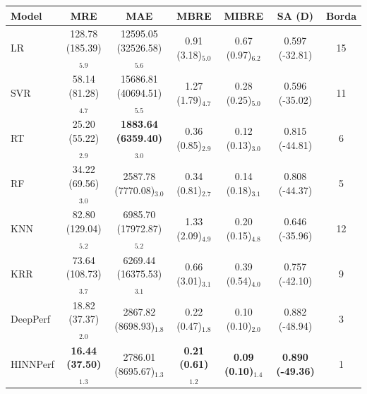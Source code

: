\begin{tabular}{lcccccc}
\toprule
Model & MRE & MAE & MBRE & MIBRE & SA (D) & Borda \\
\midrule
LR & 128.78 (185.39)$_{5.9}$ & 12595.05 (32526.58)$_{5.6}$ & 0.91 (3.18)$_{5.0}$ & 0.67 (0.97)$_{6.2}$ & 0.597 (-32.81) & 15 \\
SVR & 58.14 (81.28)$_{4.7}$ & 15686.81 (40694.51)$_{5.5}$ & 1.27 (1.79)$_{4.7}$ & 0.28 (0.25)$_{5.0}$ & 0.596 (-35.02) & 11 \\
RT & 25.20 (55.22)$_{2.9}$ & \textbf{1883.64 (6359.40)$_{3.0}$} & 0.36 (0.85)$_{2.9}$ & 0.12 (0.13)$_{3.0}$ & 0.815 (-44.81) & 6 \\
RF & 34.22 (69.56)$_{3.0}$ & 2587.78 (7770.08)$_{3.0}$ & 0.34 (0.81)$_{2.7}$ & 0.14 (0.18)$_{3.1}$ & 0.808 (-44.37) & 5 \\
KNN & 82.80 (129.04)$_{5.2}$ & 6985.70 (17972.87)$_{5.2}$ & 1.33 (2.09)$_{4.9}$ & 0.20 (0.15)$_{4.8}$ & 0.646 (-35.96) & 12 \\
KRR & 73.64 (108.73)$_{3.7}$ & 6269.44 (16375.53)$_{3.1}$ & 0.66 (3.01)$_{3.1}$ & 0.39 (0.54)$_{4.0}$ & 0.757 (-42.10) & 9 \\
DeepPerf & 18.82 (37.37)$_{2.0}$ & 2867.82 (8698.93)$_{1.8}$ & 0.22 (0.47)$_{1.8}$ & 0.10 (0.10)$_{2.0}$ & 0.882 (-48.94) & 3 \\
HINNPerf & \textbf{16.44 (37.50)$_{1.3}$} & 2786.01 (8695.67)$_{1.3}$ & \textbf{0.21 (0.61)$_{1.2}$} & \textbf{0.09 (0.10)$_{1.4}$} & \textbf{0.890 (-49.36)} & 1 \\
\bottomrule
\end{tabular}
